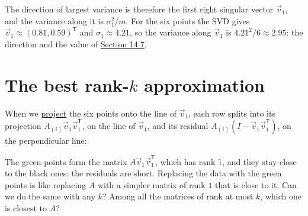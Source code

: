 \documentclass[a4paper,12pt,oneside]{report}
\begin{document}
The direction of largest variance is therefore the first right
singular vector $\vec v_1$, and the variance along it is
$\sigma_1^2/m$. For the six points the SVD gives
$\vec v_1\approx(0.81,0.59)^{\mathsf T}$ and $\sigma_1\approx4.21$, so
the variance along $\vec v_1$ is $4.21^2/6\approx2.95$: the direction
and the value of \hyperref[sec:largest-variance]{Section 14.7}.

\section{The best rank-\texorpdfstring{$k$}{k} approximation}
\label{sec:best-rank-k}

When we \hyperref[def:projection-subspace]{project} the six points
onto the line of $\vec v_1$, each row splits into its projection
$A_{(i)}\vec v_1\vec v_1^{\mathsf T}$, on the line of $\vec v_1$, and
its residual $A_{(i)}(I-\vec v_1\vec v_1^{\mathsf T})$, on the
perpendicular line:
\begin{center}
\end{center}
The green points form the matrix $A\vec v_1\vec v_1^{\mathsf T}$, which
has rank $1$, and they stay close to the black ones: the residuals are
short. Replacing the data with the green points is like replacing $A$
with a simpler matrix of rank $1$ that is close to it. Can we do the
same with any $k$? Among all the matrices of rank at most $k$, which
one is closest to $A$?
\end{document}
